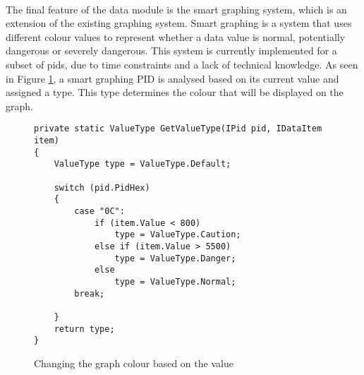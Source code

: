 {		\paragraph{}{
		The final feature of the data module is the smart graphing system, which is an extension of the existing graphing system. Smart graphing is a system that uses different colour values to represent whether a data value is normal, potentially dangerous or severely dangerous. This system is currently implemented for a subset of pids, due to time constraints and a lack of technical knowledge. As seen in Figure \ref{code:ValueType}, a smart graphing PID is analysed based on its current value and assigned a type. This type determines the colour that will be displayed on the graph.
		}			
		
		\begin{figure}[h]
			\begin{lstlisting}		
private static ValueType GetValueType(IPid pid, IDataItem item)
{
	ValueType type = ValueType.Default;
				
	switch (pid.PidHex)
	{
		case "0C":		
			if (item.Value < 800)
				type = ValueType.Caution;
			else if (item.Value > 5500)
				type = ValueType.Danger;
			else
				type = ValueType.Normal;
		break;

	}
	return type;
}
			\end{lstlisting}
			\caption{Changing the graph colour based on the value}
			\label{code:ValueType}
		\end{figure}		
		
		
		\label{ssec:DataModuleDesc}
	}


